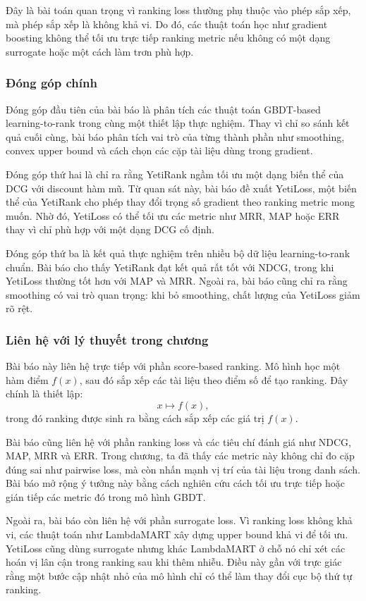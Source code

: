 Đây là bài toán quan trọng vì ranking loss thường phụ thuộc vào phép sắp xếp, mà phép sắp xếp là không khả vi. Do đó, các thuật toán học như gradient boosting không thể tối ưu trực tiếp ranking metric nếu không có một dạng surrogate hoặc một cách làm trơn phù hợp.

\subsubsection{Đóng góp chính}

Đóng góp đầu tiên của bài báo là phân tích các thuật toán GBDT-based learning-to-rank trong cùng một thiết lập thực nghiệm. Thay vì chỉ so sánh kết quả cuối cùng, bài báo phân tích vai trò của từng thành phần như smoothing, convex upper bound và cách chọn các cặp tài liệu dùng trong gradient.

Đóng góp thứ hai là chỉ ra rằng YetiRank ngầm tối ưu một dạng biến thể của DCG với discount hàm mũ. Từ quan sát này, bài báo đề xuất YetiLoss, một biến thể của YetiRank cho phép thay đổi trọng số gradient theo ranking metric mong muốn. Nhờ đó, YetiLoss có thể tối ưu các metric như MRR, MAP hoặc ERR thay vì chỉ phù hợp với một dạng DCG cố định.

Đóng góp thứ ba là kết quả thực nghiệm trên nhiều bộ dữ liệu learning-to-rank chuẩn. Bài báo cho thấy YetiRank đạt kết quả rất tốt với NDCG, trong khi YetiLoss thường tốt hơn với MAP và MRR. Ngoài ra, bài báo cũng chỉ ra rằng smoothing có vai trò quan trọng: khi bỏ smoothing, chất lượng của YetiLoss giảm rõ rệt.

\subsubsection{Liên hệ với lý thuyết trong chương}

Bài báo này liên hệ trực tiếp với phần score-based ranking. Mô hình học một hàm điểm \(f(x)\), sau đó sắp xếp các tài liệu theo điểm số để tạo ranking. Đây chính là thiết lập:
\[
    x \mapsto f(x),
\]
trong đó ranking được sinh ra bằng cách sắp xếp các giá trị \(f(x)\).

Bài báo cũng liên hệ với phần ranking loss và các tiêu chí đánh giá như NDCG, MAP, MRR và ERR. Trong chương, ta đã thấy các metric này không chỉ đo cặp đúng sai như pairwise loss, mà còn nhấn mạnh vị trí của tài liệu trong danh sách. Bài báo mở rộng ý tưởng này bằng cách nghiên cứu cách tối ưu trực tiếp hoặc gián tiếp các metric đó trong mô hình GBDT.

Ngoài ra, bài báo còn liên hệ với phần surrogate loss. Vì ranking loss không khả vi, các thuật toán như LambdaMART xây dựng upper bound khả vi để tối ưu. YetiLoss cũng dùng surrogate nhưng khác LambdaMART ở chỗ nó chỉ xét các hoán vị lân cận trong ranking sau khi thêm nhiễu. Điều này gần với trực giác rằng một bước cập nhật nhỏ của mô hình chỉ có thể làm thay đổi cục bộ thứ tự ranking.

